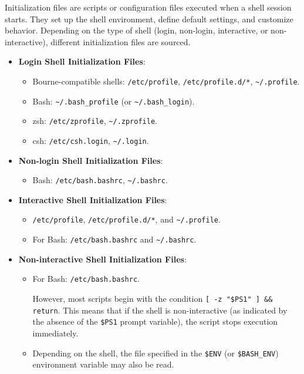 Initialization files are scripts or configuration files executed when a shell session starts. They set up the shell environment, define default settings, and customize behavior. Depending on the type of shell (login, non-login, interactive, or non-interactive), different initialization files are sourced.

\begin{itemize}
    \item \textbf{Login Shell Initialization Files}:
    \begin{itemize}
        \item Bourne-compatible shells: \texttt{/etc/profile}, \texttt{/etc/profile.d/*}, \texttt{\textasciitilde/.profile}.
        \item Bash: \texttt{\textasciitilde/.bash\_profile} (or \texttt{\textasciitilde/.bash\_login}).
        \item zsh: \texttt{/etc/zprofile}, \texttt{\textasciitilde/.zprofile}.
        \item csh: \texttt{/etc/csh.login}, \texttt{\textasciitilde/.login}.
    \end{itemize}

    \item \textbf{Non-login Shell Initialization Files}:
    \begin{itemize}
        \item Bash: \texttt{/etc/bash.bashrc}, \texttt{\textasciitilde/.bashrc}.
    \end{itemize}

    \item \textbf{Interactive Shell Initialization Files}:
    \begin{itemize}
        \item \texttt{/etc/profile}, \texttt{/etc/profile.d/*}, and \texttt{\textasciitilde/.profile}.
        \item For Bash: \texttt{/etc/bash.bashrc} and \texttt{\textasciitilde/.bashrc}.
    \end{itemize}

    \item \textbf{Non-interactive Shell Initialization Files}:
    \begin{itemize}
        \item For Bash: \texttt{/etc/bash.bashrc}. 
        
        However, most scripts begin with the condition \texttt{[ -z "\$PS1" ] \&\& return}.
        This means that if the shell is non-interactive (as indicated by the absence of the \texttt{\$PS1} prompt variable), the script stops execution immediately.
        
        \item Depending on the shell, the file specified in the \texttt{\$ENV} (or \texttt{\$BASH\_ENV}) environment variable may also be read.
    \end{itemize}
\end{itemize}


